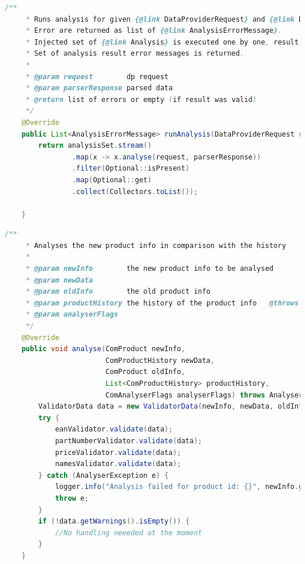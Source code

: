 \documentclass[thesis=B,czech]{FITthesis}[2012/06/26]
\begin{document}
\begin{lstlisting}[language=Java, caption={Upravená implementace hlavní metody ve třídě zajišťující spouštění validací analyzátoru.}]
    /**
     * Runs analysis for given {@link DataProviderRequest} and {@link DPParserResponse}.
     * Error are returned as list of {@link AnalysisErrorMessage}.
     * Injected set of {@link Analysis} is executed one by one, result unwrapped and kept if present.
     * Set of analysis result error messages is returned.
     *
     * @param request        dp request
     * @param parserResponse parsed data
     * @return list of errors or empty (if result was valid)
     */
    @Override
    public List<AnalysisErrorMessage> runAnalysis(DataProviderRequest request, DPParserResponse parserResponse) {
        return analysisSet.stream()
                .map(x -> x.analyse(request, parserResponse))
                .filter(Optional::isPresent)
                .map(Optional::get)
                .collect(Collectors.toList());

    }
\end{lstlisting}

\begin{lstlisting}[language=Java, caption={Původní implementace hlavní metody ve třídě zajišťující spouštění validací analyzátoru.}]
    /**
     * Analyses the new product info in comparison with the history
     *
     * @param newInfo        the new product info to be analysed
     * @param newData
     * @param oldInfo        the old product info
     * @param productHistory the history of the product info   @throws AnalyserException when analysing fails, contains error type
     * @param analyserFlags
     */
    @Override
    public void analyse(ComProduct newInfo,
                        ComProductHistory newData,
                        ComProduct oldInfo,
                        List<ComProductHistory> productHistory,
                        ComAnalyserFlags analyserFlags) throws AnalyserException {
        ValidatorData data = new ValidatorData(newInfo, newData, oldInfo, productHistory, analyserFlags);
        try {
            eanValidator.validate(data);
            partNumberValidator.validate(data);
            priceValidator.validate(data);
            namesValidator.validate(data);
        } catch (AnalyserException e) {
            logger.info("Analysis failed for product id: {}", newInfo.getProductId(), e);
            throw e;
        }
        if (!data.getWarnings().isEmpty()) {
            //No handling neeeded at the moment
        }
    }
\end{lstlisting}
\end{document}
